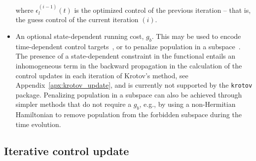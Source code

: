 \documentclass[submission, Phys]{SciPost}
\begin{document}
\begin{itemize}
  where $\epsilon_l^{(i-1)}(t)$ is the optimized control of the previous
  iteration -- that is, the guess control of the current iteration $(i)$.
\item
  An optional state-dependent running cost, \(g_b\).
  This may be used to encode time-dependent control targets~\cite{KaiserJCP2004,
  SerbanPRA2005}, or to penalize population in a subspace~\cite{PalaoPRA2008}.
  The presence of a state-dependent constraint in the functional entails an
  inhomogeneous term in the backward propagation in the calculation of the
  control updates in each iteration of Krotov's method, see
  Appendix~\ref{apx:krotov_update}, and is currently not supported by the
  \texttt{krotov} package.
  Penalizing population in a subspace can also be achieved through simpler
  methods that do not require a $g_b$, e.g., by using
  a non-Hermitian Hamiltonian to remove population from the forbidden subspace
  during the time evolution.
\end{itemize}

\subsection{Iterative control update}%
\label{sec:overview_update}
\end{document}
